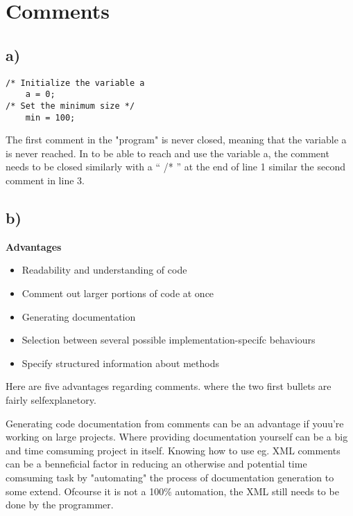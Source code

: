 \section{Comments}

\subsection{a)}

\begin{verbatim}
/* Initialize the variable a
    a = 0;
/* Set the minimum size */
    min = 100;
\end{verbatim}

The first comment in the "program" is never closed, meaning
that the variable a is never reached. In to be able to reach and use the variable
a, the comment needs to be closed similarly with a `` /* '' at the end of line 1
similar the second comment in line 3.

\subsection{b)}

\textbf{Advantages}
\begin{itemize}
    \item Readability and understanding of code
    \item Comment out larger portions of code at once
    \item Generating documentation
    \item Selection between several possible implementation-specifc behaviours
    \item Specify structured information about methods
\end{itemize}

Here are five advantages regarding comments. where the two first bullets are fairly selfexplanetory.

Generating code documentation from comments can be an advantage if youu're working on large projects.
Where providing documentation yourself can be a big and time comsuming project in itself. Knowing how
to use eg. XML comments can be a benneficial factor in reducing an otherwise and potential
time comsuming task by "automating" the process of documentation generation to some extend. Ofcourse
it is not a 100\% automation, the XML still needs to be done by the programmer. 

